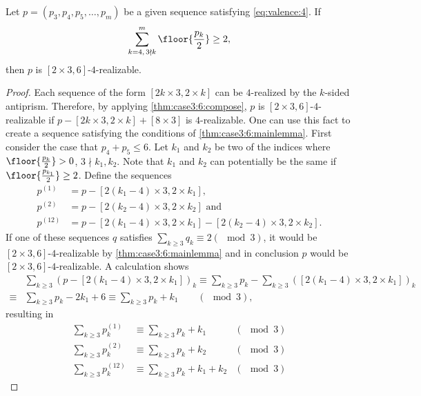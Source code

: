 \begin{theorem}\label{thm:case3:6:main}
  Let $p = (p_3, p_4, p_5, \dots, p_m)$ be a given sequence satisfying \autoref{eq:valence:4}. If
  \begin{align*}
    \sum_{k=4,\, 3 \nmid k}^m \floor{\frac{p_k}{2}} \geq 2,
  \end{align*}
  then $p$ is $[2 \times 3, 6]$-$4$-realizable.
  \begin{proof}
    Each sequence of the form $[2k \times 3, 2 \times k]$ can be $4$-realized by the $k$-sided antiprism. Therefore, by applying \autoref{thm:case3:6:compose}, $p$ is $[2 \times 3, 6]$-$4$-realizable if $p - [2k \times 3, 2 \times k] + [8 \times 3]$ is $4$-realizable. One can use this fact to create a sequence satisfying the conditions of \autoref{thm:case3:6:mainlemma}. First consider the case that $p_4 + p_5 \leq 6$. Let $k_1$ and $k_2$  be two of the indices where $\floor{\frac{p_k}{2}} > 0$, $3 \nmid k_1, k_2$. Note that $k_1$ and $k_2$ can potentially be the same if $\floor{\frac{p_{k_1}}{2}} \geq 2$. Define the sequences
    \begin{align*}
      p^{(1)} &= p - [2(k_1 - 4) \times 3, 2 \times k_1], \\
      p^{(2)} &= p - [2(k_2 - 4) \times 3, 2 \times k_2] \text{ and } \\
      p^{(12)} &= p - [2(k_1 - 4) \times 3, 2 \times k_1] - [2(k_2 - 4) \times 3, 2 \times k_2].
    \end{align*}
    If one of these sequences $q$ satisfies $\sum_{k\geq 3} q_k \equiv 2 (\mod 3)$, it would be $[2 \times 3, 6]$-$4$-realizable by \autoref{thm:case3:6:mainlemma} and in conclusion $p$ would be $[2 \times 3, 6]$-$4$-realizable. A calculation shows
    \begin{align*}
      &\sum_{k\geq 3} (p - [2(k_1 - 4) \times 3, 2 \times k_1])_k  \equiv \sum_{k\geq 3} p_k - \sum_{k\geq 3} ([2(k_1 - 4) \times 3, 2 \times k_1])_k \\
      \equiv& \sum_{k\geq 3} p_k - 2k_1 + 6 \equiv \sum_{k\geq 3} p_k + k_1 \qquad (\mod 3),
    \end{align*}
    resulting in
    \begin{align*}
      \sum_{k\geq 3} p^{(1)}_k  &\equiv \sum_{k\geq 3} p_k + k_1  & (\mod 3) \\
      \sum_{k\geq 3} p^{(2)}_k  &\equiv \sum_{k\geq 3} p_k + k_2  & (\mod 3) \\
      \sum_{k\geq 3} p^{(12)}_k  &\equiv \sum_{k\geq 3} p_k + k_1 + k_2  & (\mod 3)
    \end{align*}

\end{proof}
\end{theorem}
